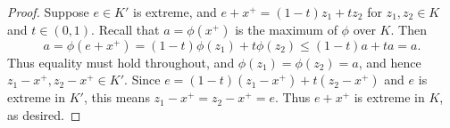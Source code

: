 \documentclass[12pt]{amsart}
\begin{document}
\begin{proof}
Suppose $e \in K'$ is extreme, and $e+x^+ = (1-t)z_1 + tz_2$ for $z_1,z_2 \in K$ and $t \in (0,1)$. Recall that $a = \phi(x^+)$ is the maximum of $\phi$ over $K$. Then
\[a = \phi(e+x^+) = (1-t)\phi(z_1) + t\phi(z_2) \leq (1-t)a + ta = a.\] Thus equality must hold throughout, and $\phi(z_1) = \phi(z_2) = a$, and hence $z_1-x^+,z_2-x^+ \in K'$. Since $e = (1-t)(z_1-x^+) + t(z_2-x^+)$ and $e$ is extreme in $K'$, this means $z_1-x^+ = z_2-x^+ = e$. Thus $e+x^+$ is extreme in $K$, as desired.
\end{proof}

%
%
%
\end{document}
